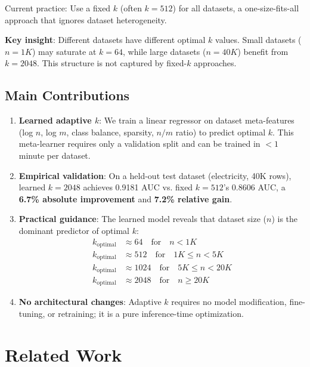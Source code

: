 \documentclass[11pt,a4paper]{article}
\begin{document}
Current practice: Use a fixed $k$ (often $k=512$) for all datasets, a one-size-fits-all approach that ignores dataset heterogeneity.

\textbf{Key insight}: Different datasets have different optimal $k$ values. Small datasets ($n=1K$) may saturate at $k=64$, while large datasets ($n=40K$) benefit from $k=2048$. This structure is not captured by fixed-$k$ approaches.

\subsection{Main Contributions}

\begin{enumerate}
\item \textbf{Learned adaptive $k$}: We train a linear regressor on dataset meta-features (log $n$, log $m$, class balance, sparsity, $n/m$ ratio) to predict optimal $k$. This meta-learner requires only a validation split and can be trained in $< 1$ minute per dataset.

\item \textbf{Empirical validation}: On a held-out test dataset (electricity, 40K rows), learned $k=2048$ achieves 0.9181 AUC vs. fixed $k=512$'s 0.8606 AUC, a \textbf{6.7\% absolute improvement} and \textbf{7.2\% relative gain}.

\item \textbf{Practical guidance}: The learned model reveals that dataset size ($n$) is the dominant predictor of optimal $k$:
\begin{align*}
k_{\text{optimal}} &\approx 64 \quad \text{for} \quad n < 1K \\
k_{\text{optimal}} &\approx 512 \quad \text{for} \quad 1K \le n < 5K \\
k_{\text{optimal}} &\approx 1024 \quad \text{for} \quad 5K \le n < 20K \\
k_{\text{optimal}} &\approx 2048 \quad \text{for} \quad n \ge 20K
\end{align*}

\item \textbf{No architectural changes}: Adaptive $k$ requires no model modification, fine-tuning, or retraining; it is a pure inference-time optimization.
\end{enumerate}

\section{Related Work}
\end{document}
